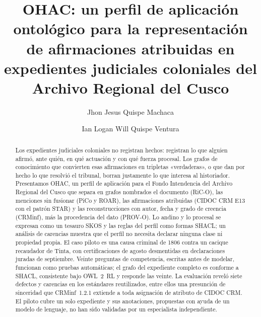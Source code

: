 \documentclass[runningheads]{llncs}
\begin{document}
\title{OHAC: un perfil de aplicación ontológico para la representación de afirmaciones atribuidas en expedientes judiciales coloniales del Archivo Regional del Cusco}

\author{Jhon Jesus Quispe Machaca \and Ian Logan Will Quispe Ventura}

\maketitle

\begin{abstract}
Los expedientes judiciales coloniales no registran hechos: registran lo que alguien afirmó, ante quién, en qué
actuación y con qué fuerza procesal. Los grafos de conocimiento que convierten esas afirmaciones en tripletas
«verdaderas», o que dan por hecho lo que resolvió el tribunal, borran justamente lo que interesa al historiador.
Presentamos OHAC, un perfil de aplicación para el Fondo Intendencia del Archivo Regional del Cusco que separa en
grafos nombrados el documento (RiC-O), las menciones sin fusionar (PiCo y ROAR), las afirmaciones atribuidas (CIDOC
CRM E13 con el patrón STAR) y las reconstrucciones con autor, fecha y grado de creencia (CRMinf), más la procedencia
del dato (PROV-O). Lo andino y lo procesal se expresan como un tesauro SKOS y las reglas del perfil como formas SHACL;
un análisis de carencias muestra que el perfil no necesita declarar ninguna clase ni propiedad propia. El caso piloto
es una causa criminal de 1806 contra un cacique recaudador de Tinta, con certificaciones de agosto desmentidas en
declaraciones juradas de septiembre. Veinte preguntas de competencia, escritas antes de modelar, funcionan como pruebas
automáticas; el grafo del expediente completo es conforme a SHACL, consistente bajo OWL~2~RL y responde las veinte. La
evaluación reveló siete defectos y carencias en los estándares reutilizados, entre ellos una presunción de
sinceridad que CRMinf~1.2.1 extiende a toda asignación de atributo de CIDOC CRM. El piloto cubre un solo expediente y
sus anotaciones, propuestas con ayuda de un modelo de lenguaje, no han sido validadas por un especialista
independiente.

\end{abstract}
\end{document}
